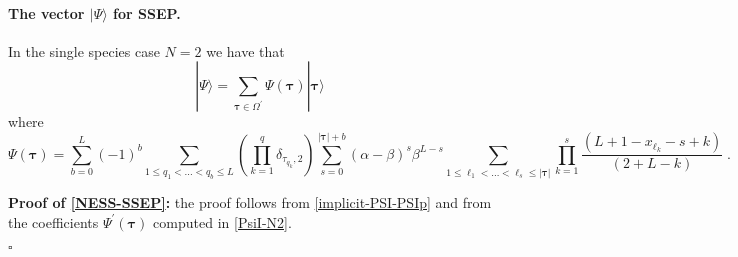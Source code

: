 \documentclass[10pt]{article}
\numberwithin{equation}{section}
\numberwithin{equation}{subsection}
\newcommand{\dt}{\;.}
\begin{document}
{\paragraph{The vector $|\Psi\rangle$ for SSEP.}
In the single species case {$N=2$} we have that  
\begin{equation}\label{NESS-SSEP}
	|\Psi\rangle=\sum_{\bm{\tau}\in \Omega^{'}}\Psi(\bm{\tau})|\bm{\tau}\rangle
\end{equation}
where
\begin{equation}
	\Psi(\bm{\tau})=\sum_{b=0}^{L}(-1)^{b}\sum_{1\leq q_{1}<\ldots<q_{b}\leq L}\left(\prod_{k=1}^{q}\delta_{\tau_{q_{k}},2}\right)\sum_{s=0}^{|\bm{\tau}|+b}(\alpha-\beta)^{s}\beta^{L-s}\sum_{1\leq \ell_{1}<\ldots<\ell_{s}\leq |\bm{\tau}|}\prod_{k=1}^{s}\frac{\left(L+1-x_{\ell_{k}}-s+k\right)}{(2+L-k)}\dt
\end{equation}

\textbf{Proof of \eqref{NESS-SSEP}:} the proof follows from \eqref{implicit-PSI-PSIp} and from the coefficients $\Psi^{'}(\bm{\tau})$ computed in \eqref{PsiI-N2}. 
\begin{flushright}
	$\square$
\end{flushright}


}
\end{document}
